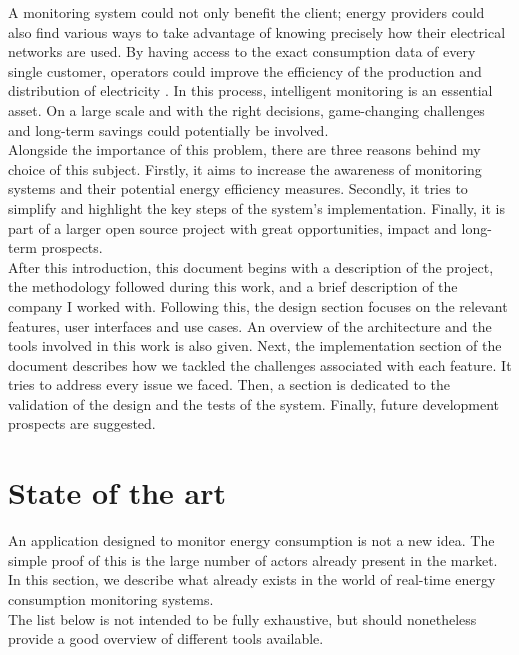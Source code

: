 \documentclass[a4paper, oneside, 11pt]{book}
\begin{document}
A monitoring system could not only benefit the client;  energy providers could also find various ways to take advantage of knowing precisely how their electrical networks are used. By having access to the exact consumption data of every single customer, operators could improve the efficiency of the production and distribution of electricity \cite{Smartgrid:online}. In this process, intelligent monitoring is an essential asset. On a large scale and with the right decisions, game-changing challenges and long-term savings could potentially be involved.\\

Alongside the importance of this problem, there are three reasons behind my choice of this subject. Firstly, it aims to increase the awareness of monitoring systems and their potential energy efficiency measures. Secondly, it tries to simplify and highlight the key steps of the system's implementation. Finally, it is part of a larger open source project with great opportunities, impact and long-term prospects.\\

After this introduction, this document begins with a description of the project, the methodology followed during this work, and a brief description of the company I worked with. Following this, the design section focuses on the relevant features, user interfaces and use cases. An overview of the architecture and the tools involved in this work is also given. Next, the implementation section of the document describes how we tackled the challenges associated with each feature. It tries to address every issue we faced. Then, a section is dedicated to the validation of the design and the tests of the system. Finally, future development prospects are suggested.

\chapter{State of the art}
An application designed to monitor energy consumption is not a new idea. The simple proof of this is the large number of actors already present in the market. In this section, we describe what already exists in the world of real-time energy consumption monitoring systems. \\

The list below is not intended to be fully exhaustive, but should nonetheless provide a good overview of different tools available.
\end{document}
